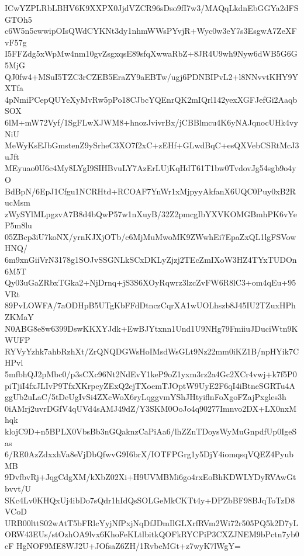 ICwYZPLRbLBHV6K9XXPX0JjdVZCR96sDso9fI7w3/MAQqLkdnEbGGYa2dFSGTOh5
c6W5n5cwwipOIsQWdCYKNt3dy1nhmWWsPYvjR+Wyc0w3eY7s3EsgwA7ZeXFvF57g
I5FFZdg5xWpMw4nm10gvZsgxqsE89sfqXwwaRbZ+8JR4U9wh9Nyw6dWB5G6G5MjG
QJ0fw4+MSuI5TZC3rCZEB5EraZY9aEBTw/ugj6PDNBIPvL2+l8NNvvtKHY9YXTfa
4pNmiPCepQUYeXyMvRw5pPo18CJbcYQEnrQK2mIQrl142yexXGFJefGi2AaqbSOX
6lM+mW72Vyf/1SgFLwXJWM8+hnozJvivrBx/jCBBlmcu4K6yNAJqnocUHk4vyNiU
MeWyKsEJbGmstenZ9ySrheC3XO7f2xC+zEHf+GLwdBqC+esQXVebCSRtMcJ3uJft
MEyuao0U6c4My8LYgI9SIHBvuLY7AzErLUjKqHdT61T1bw0TvdovJg54sgb9o4yO
BdBpN/6EpJ1Cfgu1NCRHtd+RCOAF7YnWr1xMjpyyAkfanX6UQC0Puy0xB2RucMsm
zWySYlMLpgzvA7B8d4bQwP57w1nXuyB/32Z2pmcgIbYXVKOMGBmhPK6vYeP5m8lu
05ZBcp3iU7koNX/yrnKJXjOTb/c6MjMuMwoMK9ZWwhEi7EpaZxQL1lgFSVowHNQ/
6m9xnGiiVrN3178g1SOJvSSGNLkSCxDKLyZjzj2TEcZmIXoW3HZ4TYxTUDOn6M5T
Qy03uGaZRbxTGka2+NjDrnq+jS3S6XOyRqwrz3lzcZvFW6R8lC3+om4qEu+95VRt
89PvLOWFA/7aODHpB5UTgKbFFdDtnczCqrXA1wUOLhszb8J45IU2TZuxHPhZKMaY
N0ABG8e8w6399DswKKXYJdk+EwBJYtxnn1Und1U9NHg79FmiiuJDuciWtn9KWUFP
RYVyYzhk7ahbRzhXt/ZrQNQDGWsHoIMsdWsGLt9Nz22mm0iKZ1B/npHYik7CHPvl
5mfbhQJ2pMbc0/p3sCXc96Nt2NdEvY1keP9oZ1yxm3rz2a4Gc2XCr4vwj+k7f5P0
piTjiI4fxJLIvP9TfxXKrpeyZExQ2ejTXoemTJOptW9UyE2F6qI4iBtneSGRTu4A
ggUb2uLaC/5tDeUgIvSi4ZXcWoX6ryLqggvmYShJHtyiflnFoXgoFZajPxgles3h
0iAMrj2uvrDGfV4qUVd4sAMJ49dZ/Y3SKM0OoJo4q90277Imnvo2DX+LX0nxMhqk
klojC9D+n5BPLX0VbsBb3nGQaknzCaPiAa6/lhZZnTDoysWyMuGnpdfUp0IgeSas
6/RE0AzZdxxhVa8eVjDbQfwvG9I6brX/IOTFPGrg1y5DjY4iomqsqVQEZ4PyubMB
9DvfbvRj+JqgCdgXM/kXbZ02Xi+H9UVMBMi6go4rxEoBhKDWLYDyRVAwGtbvvt/U
SKc4Lv0KHQxUj4ibDo7sQdr1hIdQsSOLGeMkCKTt4y+DPZbBF98BJqToTzD8VCoD
URB00lttS02wAtT5bFRlcYyjNfPxjNqDfJDmIlGLXrfRVm2Wi72r505PQ5k2D7yL
ORW43EUs/stOzhOA9lvx6KhoFeKLtlbitkQOFkRYCPiP3CXZJNEM9bPctn7yb0cF
HgNOF9ME8WJ2U+JOfsaZ6ZH/1RvbeMGt+z7wyK7lWgY=
